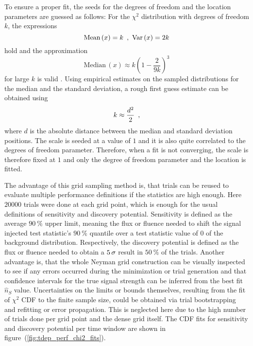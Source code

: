 To ensure a proper fit, the seeds for the degrees of freedom and the location parameters are guessed as follows:
For the $\chi^2$ distribution with degrees of freedom $k$, the expressions
\begin{equation}
  \text{Mean}\,(x) = k \enspace\text{,}\enspace
  \text{Var}\,(x) = 2k
\end{equation}
hold and the approximation
\begin{equation}
    \text{Median}\,(x) \approx k \left(1 - \frac{2}{9k}\right)^3
\end{equation}
for large $k$ is valid \cite{blobel2013statistische,Abramowitz:1974handbook}.
Using empirical estimates on the sampled distributions for the median and the standard deviation, a rough first guess estimate can be obtained using
\begin{equation}
  k \approx \frac{d^2}{2}
  \enspace\text{,}
\end{equation}
where $d$ is the absolute distance between the median and standard deviation positions.
The scale is seeded at a value of $1$ and it is also quite correlated to the degrees of freedom parameter.
Therefore, when a fit is not converging, the scale is therefore fixed at $1$ and only the degree of freedom parameter and the location is fitted.

The advantage of this grid sampling method is, that trials can be reused to evaluate multiple performance definitions if the statistics are high enough.
Here $\num{20000}$ trials were done at each grid point, which is enough for the usual definitions of sensitivity and discovery potential.
Sensitivity is defined as the average $\SI{90}{\percent}$ upper limit, meaning the flux or fluence needed to shift the signal injected test statistic's $\SI{90}{\percent}$ quantile over a test statistic value of $0$ of the background distribution.
Respectively, the discovery potential is defined as the flux or fluence needed to obtain a $\num{5}\,\sigma$ result in $\SI{50}{\percent}$ of the trials.
Another advantage is, that the whole Neyman grid construction can be visually inspected to see if any errors occurred during the minimization or trial generation and that confidence intervals for the true signal strength can be inferred from the best fit $\hat{n}_S$ value.
Uncertainties on the limits or bounds themselves, resulting from the fit of $\chi^2$ CDF to the finite sample size, could be obtained via trial bootstrapping and refitting or error propagation.
This is neglected here due to the high number of trials done per grid point and the dense grid itself.
The CDF fits for sensitivity and discovery potential per time window are shown in figure~(\ref{fig:tdep_perf_chi2_fits}).

